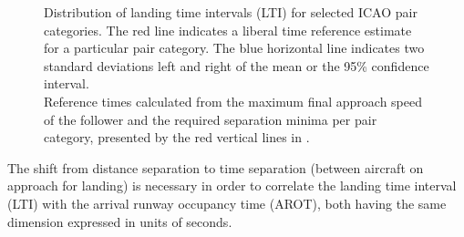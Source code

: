 \begin{figure}[h]
    \centering
    
    \vspace{1cm}
    
    
    \caption[Distribution of landing time interval (LTI) for ICAO pairs]{\protect{} Distribution of landing time intervals (LTI) for selected ICAO pair categories. The red line indicates a liberal time reference estimate for a particular pair category. The blue horizontal line indicates two standard deviations left and right of the mean or the 95\% confidence interval. \\
    \protect{} Reference times calculated from the maximum final approach speed of the follower and the required separation minima per pair category, presented by the red vertical lines in \protect{}.}
    \label{fig:time_separ_HH_HM_MH_MM_pairs}
\end{figure}

The shift from distance separation to time separation (between aircraft on approach for landing) is necessary in order to correlate the landing time interval (LTI) with the arrival runway occupancy time (AROT), both having the same dimension expressed in units of seconds.

